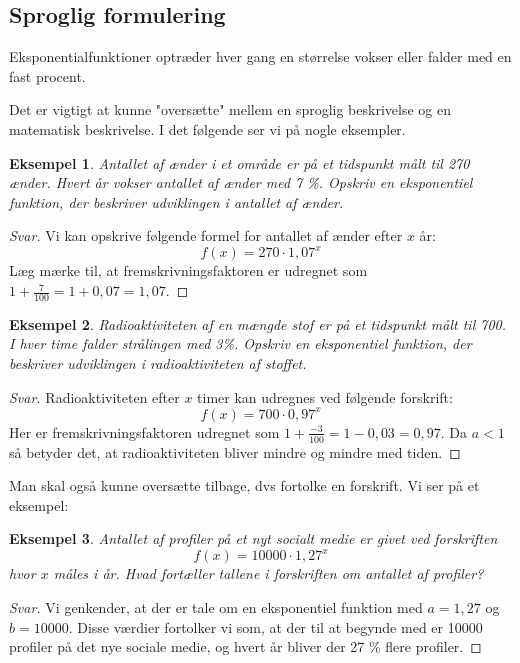 \documentclass[12pt,oneside,a4paper]{article}
\theoremstyle{plain}
\newtheorem*{eks}{Eksempel}
\begin{document}
\subsection*{Sproglig formulering}
Eksponentialfunktioner optræder hver gang en størrelse vokser eller falder
med en fast procent.

Det er vigtigt at kunne "oversætte" mellem en sproglig beskrivelse og en matematisk beskrivelse.
I det følgende ser vi på nogle eksempler.

\begin{eks}
    Antallet af ænder i et område er på et tidspunkt målt til 270 ænder. Hvert
    år vokser antallet af ænder med 7 \%. Opskriv en eksponentiel funktion, der
    beskriver udviklingen i antallet af ænder.
\end{eks}
\begin{proof}[Svar]
    Vi kan opskrive følgende formel for antallet af ænder efter $x$ år:
    $$
    f(x) = 270 \cdot 1,07^x
    $$
    Læg mærke til, at fremskrivningsfaktoren er udregnet som $1+\frac{7}{100} =
    1+0,07 = 1,07$.
\end{proof}

\begin{eks}
    Radioaktiviteten af en mængde stof er på et tidspunkt målt til 700. I
    hver time falder strålingen med 3\%. Opskriv en eksponentiel funktion,
    der beskriver udviklingen i radioaktiviteten af stoffet.
\end{eks}
\begin{proof}[Svar]
    Radioaktiviteten efter $x$ timer kan udregnes ved følgende forskrift:
    $$
    f(x) = 700 \cdot 0,97^x
    $$
    Her er fremskrivningsfaktoren udregnet som $1 + \frac{-3}{100} = 1-0,03 = 0,97$.
    Da $a<1$ så betyder det, at radioaktiviteten bliver mindre og mindre med tiden.
\end{proof}

Man skal også kunne oversætte tilbage, dvs fortolke en forskrift. Vi ser på et eksempel:

\begin{eks}
    Antallet af profiler på et nyt socialt medie er givet ved forskriften
    $$
    f(x) = 10000 \cdot 1,27^x
    $$
    hvor $x$ måles i år. Hvad fortæller tallene i forskriften om antallet af
    profiler?
\end{eks}
\begin{proof}[Svar]
    Vi genkender, at der er tale om en eksponentiel funktion med $a=1,27$ og
    $b=10000$.  Disse værdier fortolker vi som, at der til at begynde med er
    10000 profiler på det nye sociale medie, og hvert år bliver der 27 \% flere
    profiler.
\end{proof}
\end{document}
